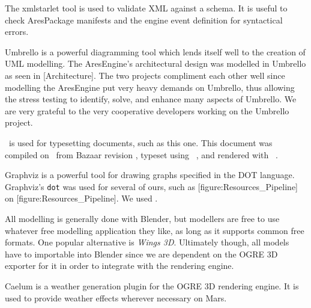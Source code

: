 
The xmlstarlet tool is used to validate XML against a schema. It is useful to check AresPackage manifests and the engine event definition for syntactical errors.


Umbrello is a powerful diagramming tool which lends itself well to the creation of UML modelling. The AresEngine's architectural design was modelled in Umbrello as seen in [Architecture]. The two projects compliment each other well since modelling the AresEngine put very heavy demands on Umbrello, thus allowing the stress testing to identify, solve, and enhance many aspects of Umbrello. We are very grateful to the very cooperative developers working on the Umbrello project.
\stopitemize



\startitemize[4]
\setupwhitespace[big]
\head {\em \CONTEXT}

\CONTEXT\ is used for typesetting documents, such as this one. This document was compiled on \currentdate\ from Bazaar revision \BazaarRevision, typeset using \CONTEXT\ \contextversion, and rendered with \texenginename\ \texengineversion.


Graphviz is a powerful tool for drawing graphs specified in the DOT language. Graphviz's {\tt dot} was used for several of ours, such as [figure:Resources_Pipeline] on [figure:Resources_Pipeline]. We used \GraphvizVersion.
\stopitemize


\startitemize[4]
\setupwhitespace[big]

All modelling is generally done with Blender, but modellers are free to use whatever free modelling application they like, as long as it supports common free formats. One popular alternative is {\it Wings 3D}. Ultimately though, all models have to importable into Blender since we are dependent on the OGRE 3D exporter for it in order to integrate with the rendering engine.


Caelum is a weather generation plugin for the OGRE 3D rendering engine. It is used to provide weather effects wherever necessary on Mars.



